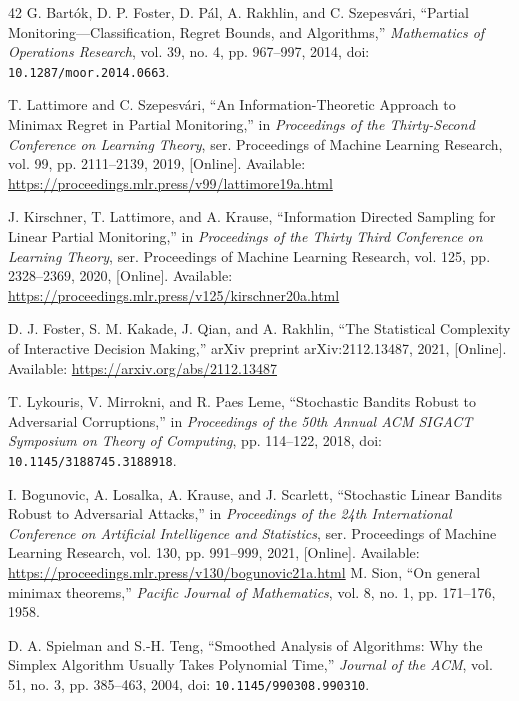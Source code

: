 \begin{thebibliography}{42}
G. Bart\'{o}k, D. P. Foster, D. P\'{a}l, A. Rakhlin, and C. Szepesv\'{a}ri, ``Partial Monitoring---Classification, Regret Bounds, and Algorithms,'' \emph{Mathematics of Operations Research}, vol. 39, no. 4, pp. 967--997, 2014, doi: \nolinkurl{10.1287/moor.2014.0663}.

T. Lattimore and C. Szepesv\'{a}ri, ``An Information-Theoretic Approach to Minimax Regret in Partial Monitoring,'' in \emph{Proceedings of the Thirty-Second Conference on Learning Theory}, ser. Proceedings of Machine Learning Research, vol. 99, pp. 2111--2139, 2019, [Online]. Available: \url{https://proceedings.mlr.press/v99/lattimore19a.html}

J. Kirschner, T. Lattimore, and A. Krause, ``Information Directed Sampling for Linear Partial Monitoring,'' in \emph{Proceedings of the Thirty Third Conference on Learning Theory}, ser. Proceedings of Machine Learning Research, vol. 125, pp. 2328--2369, 2020, [Online]. Available: \url{https://proceedings.mlr.press/v125/kirschner20a.html}

D. J. Foster, S. M. Kakade, J. Qian, and A. Rakhlin, ``The Statistical Complexity of Interactive Decision Making,'' arXiv preprint arXiv:2112.13487, 2021, [Online]. Available: \url{https://arxiv.org/abs/2112.13487}

T. Lykouris, V. Mirrokni, and R. Paes Leme, ``Stochastic Bandits Robust to Adversarial Corruptions,'' in \emph{Proceedings of the 50th Annual ACM SIGACT Symposium on Theory of Computing}, pp. 114--122, 2018, doi: \nolinkurl{10.1145/3188745.3188918}.

I. Bogunovic, A. Losalka, A. Krause, and J. Scarlett, ``Stochastic Linear Bandits Robust to Adversarial Attacks,'' in \emph{Proceedings of the 24th International Conference on Artificial Intelligence and Statistics}, ser. Proceedings of Machine Learning Research, vol. 130, pp. 991--999, 2021, [Online]. Available: \url{https://proceedings.mlr.press/v130/bogunovic21a.html}
M. Sion, ``On general minimax theorems,'' \emph{Pacific Journal of Mathematics}, vol. 8, no. 1, pp. 171--176, 1958.

D. A. Spielman and S.-H. Teng, ``Smoothed Analysis of Algorithms: Why the Simplex Algorithm Usually Takes Polynomial Time,'' \emph{Journal of the ACM}, vol. 51, no. 3, pp. 385--463, 2004, doi: \nolinkurl{10.1145/990308.990310}.


\end{thebibliography}
